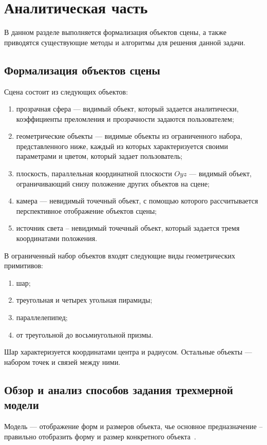 \section{Аналитическая часть}
В данном разделе выполняется формализация объектов сцены, а также приводятся существующие методы и алгоритмы для решения данной задачи.

\subsection{Формализация объектов сцены}
Сцена состоит из следующих объектов:
\begin{enumerate}
	\item прозрачная сфера --- видимый объект, который задается аналитически, коэффициенты преломления и прозрачности задаются пользователем;
	\item геометрические объекты --- видимые объекты из ограниченного набора, представленного ниже, каждый из которых характеризуется своими параметрами и цветом, который задает пользователь;
	\item плоскость, параллельная координатной плоскости $Oyz$ --- видимый объект, ограничивающий снизу положение других объектов на сцене;
	\item камера --- невидимый точечный объект, с помощью которого рассчитывается перспективное отображение объектов сцены;
	\item источник света -- невидимый точечный объект, который задается тремя координатами положения.
\end{enumerate}

В ограниченный набор объектов входят следующие виды геометрических примитивов:
\begin{enumerate}
	\item шар;
	\item треугольная и четырех угольная пирамиды;
	\item параллелепипед;
	\item от треугольной до восьмиугольной призмы.
\end{enumerate}

Шар характеризуется координатами центра и радиусом. Остальные объекты --- набором точек и связей между ними.


\subsection{Обзор и анализ способов задания трехмерной модели}
Модель --- отображение форм и размеров объекта, чье основное предназначение -- правильно отобразить форму и размер конкретного объекта~\cite{Kurov}. 

